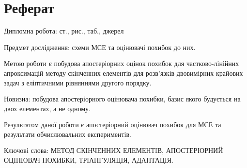 
\section*{Реферат}

Дипломна робота: \pageref{LastPage} ст.,  рис.,  таб.,  джерел

Предмет дослідження: схеми МСЕ та оцінювачі похибок до них.

Метою роботи є побудова апостеріорних оцінок похибок для частково-лінійних апроксимацій методу скінченних елементів для розв'язків двовимірних крайових задач з еліптичними рівняннями другого порядку.

Новизна: побудова апостеріорного оцінювача похибки, базис якого будується на двох елементах, а не одному.

Результатом даної роботи є апостеріорний оцінювач похибок для МСЕ та результати обчислювальних експериментів.

Ключові слова: \MakeTextUppercase{метод скінченних елементів, апостеріорний оцінювач похибки, тріангуляція, адаптація}.

